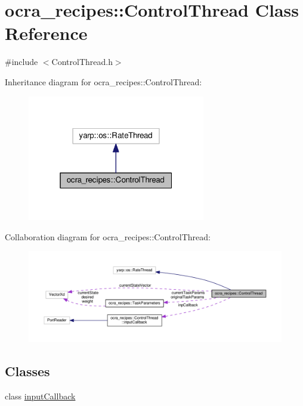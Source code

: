 \hypertarget{classocra__recipes_1_1ControlThread}{}\section{ocra\+\_\+recipes\+:\+:Control\+Thread Class Reference}
\label{classocra__recipes_1_1ControlThread}


{\ttfamily \#include $<$Control\+Thread.\+h$>$}



Inheritance diagram for ocra\+\_\+recipes\+:\+:Control\+Thread\+:
\nopagebreak
\begin{figure}[H]
\begin{center}
\leavevmode
\includegraphics[width=220pt]{d0/db7/classocra__recipes_1_1ControlThread__inherit__graph}
\end{center}
\end{figure}


Collaboration diagram for ocra\+\_\+recipes\+:\+:Control\+Thread\+:
\nopagebreak
\begin{figure}[H]
\begin{center}
\leavevmode
\includegraphics[width=350pt]{d0/df5/classocra__recipes_1_1ControlThread__coll__graph}
\end{center}
\end{figure}
\subsection*{Classes}
\begin{DoxyCompactItemize}
\item 
class \hyperlink{classocra__recipes_1_1ControlThread_1_1inputCallback}{input\+Callback}
\end{DoxyCompactItemize}
